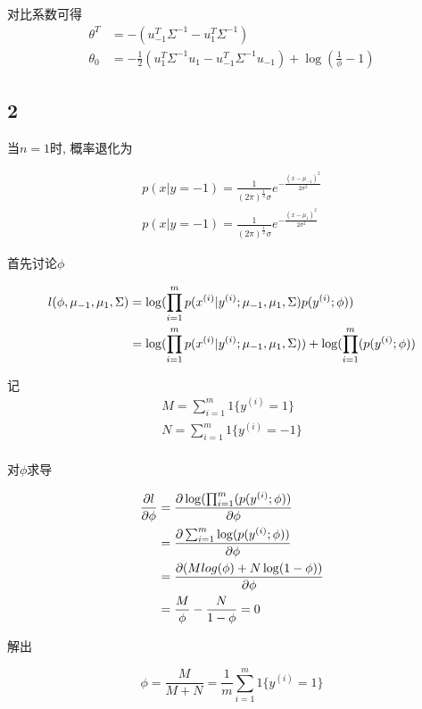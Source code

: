 \documentclass{ctexart}
\begin{document}
对比系数可得
\begin{align}
	\theta^T &= -(u_{-1}^T\Sigma^{-1}-u_1^T\Sigma^{-1}) \\
	\theta_0 &= -\frac{1}{2}(u_1^T\Sigma^{-1}u_1 - u_{-1}^T\Sigma^{-1}u_{-1}) + \log(\frac{1}{\phi} - 1)
\end{align}

\subsection{2}

当$n=1$时, 概率退化为

\begin{align}
	p(x|y= -1) = \frac{1}{(2\pi)^{\frac{1}{2}}\sigma}e^{-\frac{(x-\mu_{-1})^2}{2\sigma^2}} \\
	p(x|y= -1) = \frac{1}{(2\pi)^{\frac{1}{2}}\sigma}e^{-\frac{(x-\mu_{1})^2}{2\sigma^2}}	
\end{align}

首先讨论$\phi$

\begin{align}
	l(\phi,\mu_{-1},\mu_1,\Sigma) &= \log(\prod_{i=1}^m p(x^{(i)}|y^{(i)};\mu_{-1},\mu_1,\Sigma)p(y^{(i)};\phi)) \notag \\
	&= \log(\prod_{i=1}^m p(x^{(i)}|y^{(i)};\mu_{-1},\mu_1,\Sigma)) + \log(\prod_{i=1}^m(p(y^{(i)};\phi)) \notag \\
\end{align}

记
\begin{align*}
M = \sum_{i=1}^m 1\{y^{(i)} = 1\} \\
N = \sum_{i=1}^m 1\{y^{(i)} = -1\} \\	
\end{align*}

对$\phi$求导

\begin{align}
	\frac{\partial l}{\partial \phi} &= \frac{\partial \log(\prod_{i=1}^m(p(y^{(i)};\phi))}{\partial \phi} \notag \\
	&= \frac{\partial \sum_{i=1}^m \log(p(y^{(i)};\phi))}{\partial \phi} \notag \\
	&= \frac{\partial(Mlog(\phi) + N\log(1-\phi))}{\partial \phi} \notag \\
	&= \frac{M}{\phi} - \frac{N}{1-\phi} = 0 \notag
\end{align}

解出

\begin{equation}
	\phi = \frac{M}{M+N}  =\frac{1}{m}  \sum_{i=1}^m 1\{y^{(i)} = 1\}
\end{equation}
\end{document}
